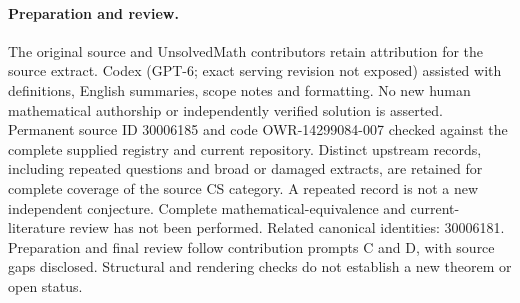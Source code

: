 \documentclass[11pt]{article}
\begin{document}
\paragraph{Preparation and review.}
The original source and UnsolvedMath contributors retain attribution for the source extract. Codex (GPT-6; exact serving revision not exposed) assisted with definitions, English summaries, scope notes and formatting. No new human mathematical authorship or independently verified solution is asserted. Permanent source ID 30006185 and code OWR-14299084-007 checked against the complete supplied registry and current repository. Distinct upstream records, including repeated questions and broad or damaged extracts, are retained for complete coverage of the source CS category. A repeated record is not a new independent conjecture. Complete mathematical-equivalence and current-literature review has not been performed. Related canonical identities: 30006181. Preparation and final review follow contribution prompts C and D, with source gaps disclosed. Structural and rendering checks do not establish a new theorem or open status.
\label{end:30006185}
\end{document}

